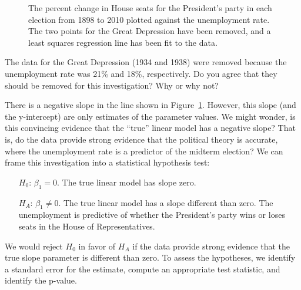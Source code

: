 \begin{figure}[h]
  \centering
  \caption{The percent change in House seats for the
      President's party in each election from 1898 to 2010
      plotted against the unemployment rate.
      The two points for the Great Depression have been
      removed, and a least squares regression line has been
      fit to the data.}
  \label{unemploymentAndChangeInHouse}
\end{figure}

\begin{exercisewrap}
\begin{nexercise}
The data for the Great Depression (1934 and 1938) were removed because the unemployment rate was 21\% and 18\%, respectively. Do you agree that they should be removed for this investigation? Why or why not?\footnotemark
\end{nexercise}
\end{exercisewrap}

There is a negative slope in the line shown in Figure~\ref{unemploymentAndChangeInHouse}. However, this slope (and the y-intercept) are only estimates of the parameter values. We might wonder, is this convincing evidence that the ``true'' linear model has a negative slope? That is, do the data provide strong evidence that the political theory is accurate, where the unemployment rate is a predictor of the midterm election? We can frame this investigation into a statistical hypothesis test:
\begin{itemize}
\item[$H_0$:] $\beta_1 = 0$. The true linear model has slope zero.
\item[$H_A$:] $\beta_1 \neq 0$. The true linear model has a slope different than zero. The unemployment is predictive of whether the President's party wins or loses seats in the House of Representatives.
\end{itemize}
We would reject $H_0$ in favor of $H_A$ if the data provide strong evidence that the true slope parameter is different than zero.
To assess the hypotheses, we identify a standard error for the estimate, compute an appropriate test statistic, and identify the p-value.

